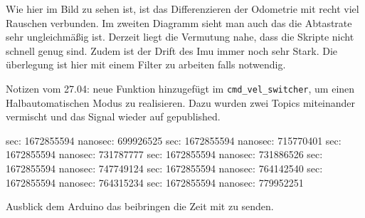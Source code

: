 Wie hier im Bild zu sehen ist, ist das Differenzieren der Odometrie mit recht viel Rauschen verbunden. Im zweiten Diagramm sieht man auch das die Abtastrate sehr ungleichmäßig ist. Derzeit liegt die Vermutung nahe, dass die Skripte nicht schnell genug sind. 
Zudem ist der Drift des Imu immer noch sehr Stark. Die überlegung ist hier mit einem Filter zu arbeiten falls notwendig.

Notizen vom 27.04:
neue Funktion hinzugefügt im \lstinline{cmd_vel_switcher}, um einen Halbautomatischen Modus zu realisieren. Dazu wurden zwei Topics miteinander vermischt und das Signal wieder auf gepublished.

    sec: 1672855594
    nanosec: 699926525
    sec: 1672855594
    nanosec: 715770401
    sec: 1672855594
    nanosec: 731787777
    sec: 1672855594
    nanosec: 731886526
    sec: 1672855594
    nanosec: 747749124
    sec: 1672855594
    nanosec: 764142540
    sec: 1672855594
    nanosec: 764315234
    sec: 1672855594
    nanosec: 779952251


Ausblick dem Arduino das beibringen die Zeit mit zu senden.


